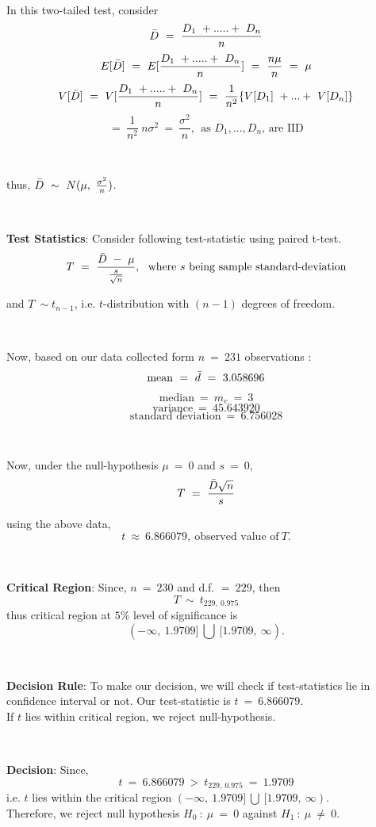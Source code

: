 \

 In this two-tailed test, consider
 $$\Bar{D} \ = \ \frac{D_{1} \ + ..... + \ D_{n}}{n}$$
 $$E[\Bar{D}] \ = \ E[\frac{D_{1} \ + ..... + \ D_{n}}{n}] \ = \ \frac{n\mu}{n} \ = \ \mu$$
 $$V[\Bar{D}] \ = \ V[\frac{D_{1} \ + ..... + \ D_{n}}{n}] \ = \ \frac{1}{n^{2}} \{ V[D_{1}] \ + ... + \ V[D_{n}] \}$$
 $$= \ \frac{1}{n^{2}} \ n\sigma^{2} \ = \ \frac{\sigma^{2}}{n}, \ \ \text{as \ $D_{1}, ... , D_{n}$, \ are IID}$$

 \ 

 thus, $\Bar{D} \ \sim \ N(\mu, \ \frac{\sigma^{2}}{n})$.

 \ 

 \textbf{Test Statistics}:
Consider following test-statistic using paired t-test.
$$T \ = \ \frac{\Bar{D} \ - \ \mu}{\frac{s}{\sqrt{n}}} , \ \ \text{where $s$ being sample standard-deviation}$$

and $T \ \sim t_{n-1}$, i.e. $t$-distribution with $(n-1)$ degrees of freedom.

\ 

Now, based on our data collected form $n \ = \ 231$ observations :
$$\text{mean} \ = \ \Bar{d} \ = \ 3.058696$$
$$\text{median} \ = \ m_{e} \ = \ 3$$
$$\text{variance} \ = \ 45.643920$$
$$\text{standard deviation} \ = \ 6.756028$$

\ 

Now, under the null-hypothesis $\mu \ = \ 0$ and $s \ = \ 0$,
$$T \ = \ \frac{\Bar{D} \sqrt{n}}{s}$$

using the above data,
$$t \ \approx \ 6.866079, \ \text{observed value of} \ T.$$

\ 

\textbf{Critical Region}:
Since, $n \ = \ 230$ and d.f. $= \ 229$, then
$$T \ \sim \ t_{229, \ 0.975}$$
thus critical region at $5 \%$ level of significance is
$$(-\infty , \ 1.9709] \ \bigcup \ [1.9709, \ \infty).$$

\ 

\textbf{Decision Rule}: To make our decision, we will check if test-statistics lie in confidence interval or not. Our test-statistic is $t \ = \ 6.866079$.\\
If $t$ lies within critical region, we reject null-hypothesis.

\ 

\textbf{Decision}: Since, 
$$t \ = \ 6.866079 \ > \ t_{229, \ 0.975} \ = \ 1.9709$$
i.e. $t$ lies within the critical region $(-\infty , \ 1.9709] \ \bigcup \ [1.9709, \ \infty)$.\\
Therefore, we reject null hypothesis $H_{0} \ : \ \mu \ = \ 0$ against $H_{1} \ : \ \mu \ \neq \ 0$.

